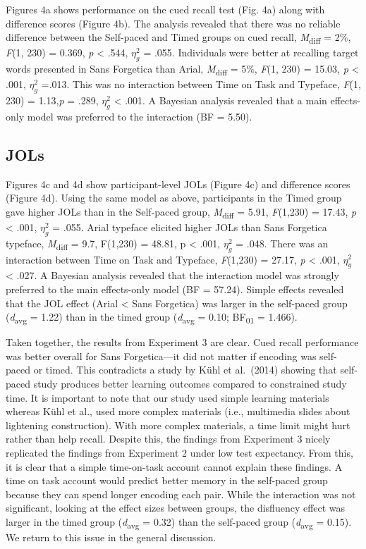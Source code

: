 \documentclass[
  english,
  jou]{apa7}
\begin{document}
Figures 4a shows performance on the cued recall test (Fig. 4a) along with difference scores (Figure 4b). The analysis revealed that there was no reliable difference between the Self-paced and Timed groups on cued recall, \emph{M}\textsubscript{diff} = 2\%, \emph{F}(1, 230) = 0.369, \emph{p} \textless{} .544, \(\eta_{g}^{2}\) = .055. Individuals were better at recalling target words presented in Sans Forgetica than Arial, \emph{M}\textsubscript{diff} = 5\%, \emph{F}(1, 230) = 15.03, \emph{p} \textless{} .001, \(\eta_{g}^{2}\) =.013. This was no interaction between Time on Task and Typeface, \emph{F}(1, 230) = 1.13,\emph{p} = .289, \(\eta_{g}^{2}\) \textless{} .001. A Bayesian analysis revealed that a main effects-only model was preferred to the interaction (BF = 5.50).

\hypertarget{jols-2}{%
\subsection{JOLs}\label{jols-2}}

Figures 4c and 4d show participant-level JOLs (Figure 4c) and difference scores (Figure 4d). Using the same model as above, participants in the Timed group gave higher JOLs than in the Self-paced group, \emph{M}\textsubscript{diff} = 5.91, \emph{F}(1,230) = 17.43, \emph{p} \textless{} .001, \(\eta_{g}^{2}\) = .055. Arial typeface elicited higher JOLs than Sans Forgetica typeface, \emph{M}\textsubscript{diff} = 9.7, F(1,230) = 48.81, p \textless{} .001, \(\eta_{g}^{2}\) = .048. There was an interaction between Time on Task and Typeface, \emph{F}(1,230) = 27.17, \emph{p} \textless{} .001, \(\eta_{g}^{2}\) \textless{} .027. A Bayesian analysis revealed that the interaction model was strongly preferred to the main effects-only model (BF = 57.24). Simple effects revealed that the JOL effect (Arial \textless{} Sans Forgetica) was larger in the self-paced group (\emph{d}\textsubscript{avg} = 1.22) than in the timed group (\emph{d}\textsubscript{avg} = 0.10; BF\textsubscript{01} = 1.466).

Taken together, the results from Experiment 3 are clear. Cued recall performance was better overall for Sans Forgetica---it did not matter if encoding was self-paced or timed. This contradicts a study by Kühl et al.~(2014) showing that self-paced study produces better learning outcomes compared to constrained study time. It is important to note that our study used simple learning materials whereas Kühl et al., used more complex materials (i.e., multimedia slides about lightening construction). With more complex materials, a time limit might hurt rather than help recall. Despite this, the findings from Experiment 3 nicely replicated the findings from Experiment 2 under low test expectancy. From this, it is clear that a simple time-on-task account cannot explain these findings. A time on task account would predict better memory in the self-paced group because they can spend longer encoding each pair. While the interaction was not significant, looking at the effect sizes between groups, the disfluency effect was larger in the timed group (\emph{d}\textsubscript{avg} = 0.32) than the self-paced group (\emph{d}\textsubscript{avg} = 0.15). We return to this issue in the general discussion.
\end{document}
